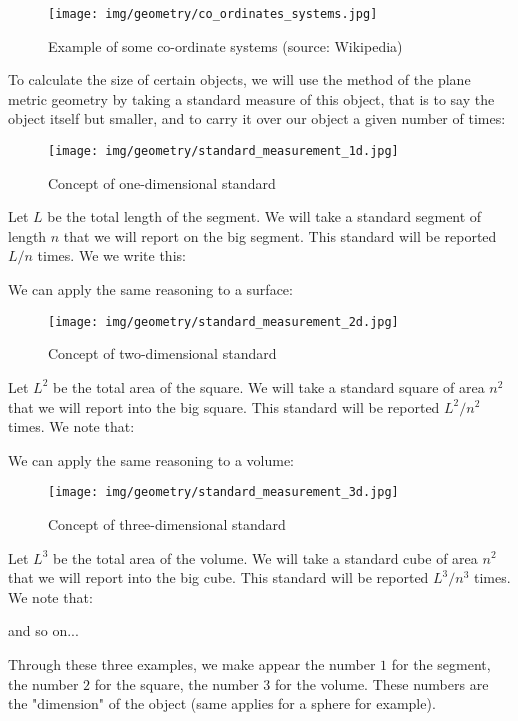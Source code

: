 	\begin{figure}[H]
		\centering
		\texttt{[image: img/geometry/co\_ordinates\_systems.jpg]}
		\caption[Example of some co-ordinate systems]{Example of some co-ordinate systems (source: Wikipedia)}
	\end{figure}

	To calculate the size of certain objects, we will use the method of the plane metric geometry by taking a standard measure of this object, that is to say the object itself but smaller, and to carry it over our object a given number of times:
	\begin{figure}[H]
		\centering
		\texttt{[image: img/geometry/standard\_measurement\_1d.jpg]}
		\caption{Concept of one-dimensional standard}
	\end{figure}
	Let $L$ be the total length of the segment. We will take a standard segment of length $n$ that we will report on the big segment. This standard will be reported $L / n$ times. We we write this:
	
	We can apply the same reasoning to a surface:
	\begin{figure}[H]
		\centering
		\texttt{[image: img/geometry/standard\_measurement\_2d.jpg]}
		\caption{Concept of two-dimensional standard}
	\end{figure}
	Let $L^2$ be the total area of the square. We will take a standard square of area $n^2$ that we will report into the big square. This standard will be reported $L^2 / n^2$ times. We note that:
	
	We can apply the same reasoning to a volume:
	\begin{figure}[H]
		\centering
		\texttt{[image: img/geometry/standard\_measurement\_3d.jpg]}
		\caption{Concept of three-dimensional standard}
	\end{figure}
	Let $L^3$ be the total area of the volume. We will take a standard cube of area $n^2$ that we will report into the big cube. This standard will be reported $L^3 / n^3$ times. We note that:
	
	and so on...
	
	Through these three examples, we make appear the number $1$ for the segment,  the number $2$ for the square, the number $3$ for the volume. These numbers are the "dimension" of the object (same applies for a sphere for example).
	
